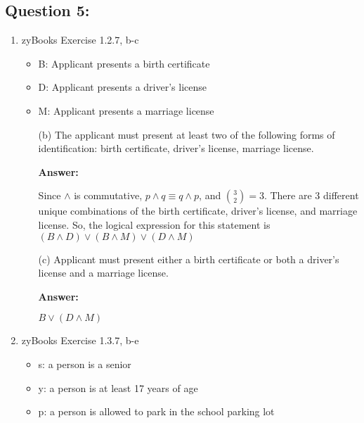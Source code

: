 \documentclass[12pt]{extreport}
\newcommand{\answer}[0]{\medskip \textbf{Answer:} \medskip}
\begin{document}
\subsection*{Question 5:}

\begin{enumerate}
    
    \item zyBooks Exercise 1.2.7, b-c
    
        \begin{itemize}
            \item B: Applicant presents a birth certificate
            \item D: Applicant presents a driver's license
            \item M: Applicant presents a marriage license
        \end{itemize}
    
        \begin{enumerate}
            
            \item[(b)] The applicant must present at least two of the following forms of identification: birth certificate, driver's license, marriage license.

                \answer

                Since \( \land \) is commutative, \( p \land q \equiv q \land p \), and \( {3 \choose 2} = 3 \). There are 3 different unique combinations of the birth certificate, driver's license, and marriage license. So, the logical expression for this statement is \( (B \land D) \lor (B \land M) \lor (D \land M) \)    
                
            \item[(c)] Applicant must present either a birth certificate or both a driver's license and a marriage license.

                \answer

                \( B \lor (D \land M) \)

        \end{enumerate}

    \item zyBooks Exercise 1.3.7, b-e
    
        \begin{itemize}
            \item s: a person is a senior
            \item y: a person is at least 17 years of age
            \item p: a person is allowed to park in the school parking lot
        \end{itemize}
    

\end{enumerate}
\end{document}
